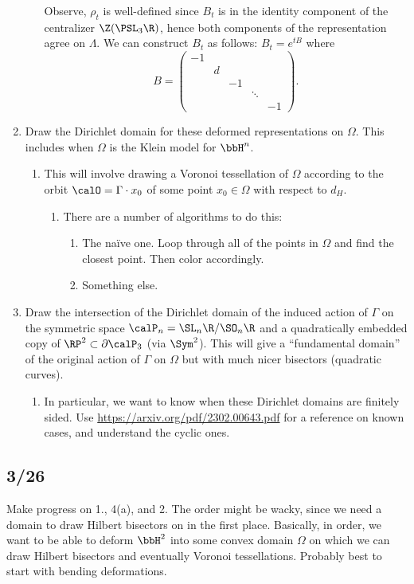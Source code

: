 \documentclass[12pt]{article}%
\begin{document}
\begin{enumerate}
\begin{enumerate}
			Observe, $\rho_t$ is well-defined since $B_t$ is in the identity component of the centralizer $\Z(\PSL_3\R)$, hence both components of the representation agree on $\Lambda$. We can construct $B_t$ as follows: $B_t = e^{tB}$ where \[B = \begin{pmatrix} -1 \\ &d \\ &&-1 \\ &&&\ddots \\ &&&&-1 \end{pmatrix}. \]  
	\end{enumerate}
	\item Draw the Dirichlet domain for these deformed representations on $\Omega$. This includes when $\Omega$ is the Klein model for $\bbH^n$.
	\begin{enumerate}
		\item This will involve drawing a Voronoi tessellation of $\Omega$ according to the orbit $\calO = \Gamma \cdot x_0$ of some point $x_0 \in \Omega$ with respect to $d_H$.
		\begin{enumerate}
			\item There are a number of algorithms to do this:
			\begin{enumerate}
				\item The na\"ive one. Loop through all of the points in $\Omega$ and find the closest point. Then color accordingly.
				\item Something else.
			\end{enumerate}
		\end{enumerate}
	\end{enumerate}
	\item Draw the intersection of the Dirichlet domain of the induced action of $\Gamma$ on the symmetric space $\calP_n = \SL_n\R/\SO_n\R$ and a quadratically embedded copy of $\RP^2 \subset \partial \calP_3$ (via $\Sym^2$). This will give a ``fundamental domain'' of the original action of $\Gamma$ on $\Omega$ but with much nicer bisectors (quadratic curves).
	\begin{enumerate}
		\item In particular, we want to know when these Dirichlet domains are finitely sided. Use \href{https://arxiv.org/pdf/2302.00643.pdf}{https://arxiv.org/pdf/2302.00643.pdf} for a reference on known cases, and understand the cyclic ones.
	\end{enumerate}
\end{enumerate}

\subsection*{3/26}
Make progress on 1., 4(a), and 2. The order might be wacky, since we need a domain to draw Hilbert bisectors on in the first place. Basically, in order, we want to be able to deform $\bbH^2$ into some convex domain $\Omega$ on which we can draw Hilbert bisectors and eventually Voronoi tessellations. Probably best to start with bending deformations.
\end{document}
